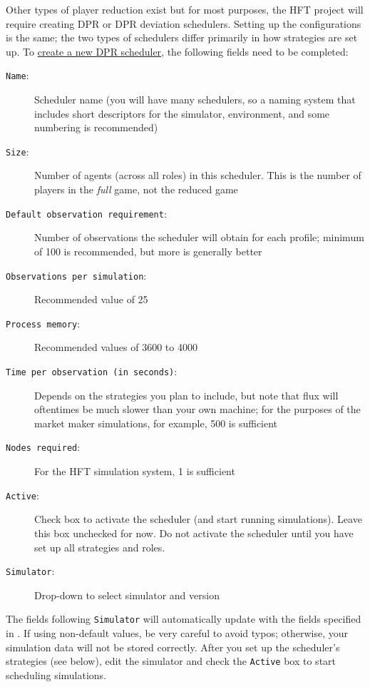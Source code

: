 \documentclass[11pt]{article}
\begin{document}
Other types of player reduction exist but for most purposes, the HFT project will require creating DPR or DPR deviation schedulers.
Setting up the configurations is the same; the two types of schedulers differ primarily in how strategies are set up.
To \href{http://egtaonline.eecs.umich.edu/dpr_schedulers/new}{create a new DPR scheduler}, the following fields need to be completed:
\begin{description}
\item[\texttt{Name}:] Scheduler name (you will have many schedulers, so a naming system that includes short descriptors for the simulator, environment, and some numbering is recommended)
\item[\texttt{Size}:] Number of agents (across all roles) in this scheduler. This is the number of players in the \emph{full} game, not the reduced game
\item[\texttt{Default observation requirement}:] Number of observations the scheduler will obtain for each profile; minimum of 100 is recommended, but more is generally better
\item[\texttt{Observations per simulation}:] Recommended value of 25
\item[\texttt{Process memory}:] Recommended values of 3600 to 4000
\item[\texttt{Time per observation (in seconds)}:] Depends on the strategies you plan to include, but note that flux will oftentimes be much slower than your own machine; for the purposes of the market maker simulations, for example, 500 is sufficient
\item[\texttt{Nodes required}:] For the HFT simulation system, 1 is sufficient
\item[\texttt{Active}:] Check box to activate the scheduler (and start running simulations). Leave this box unchecked for now.
Do not activate the scheduler until you have set up all strategies and roles.
\item[\texttt{Simulator}:] Drop-down to select simulator and version
\end{description}
The fields following \texttt{Simulator} will automatically update with the fields specified in . If using non-default values, be very careful to avoid typos; otherwise, your simulation data will not be stored correctly.
After you set up the scheduler's strategies (see below), edit the simulator and check the \texttt{Active} box to start scheduling simulations.
\end{document}
